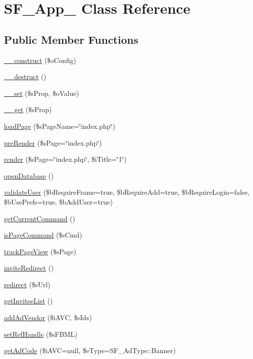 \hypertarget{classSF__App__02}{
\section{SF\_\-App\_ Class Reference}
\label{classSF__App__02}
}
\subsection*{Public Member Functions}
\begin{DoxyCompactItemize}
\item 
\hyperlink{classSF__App__02_a1609c01e73facfc2e0870dab45eddc4d}{\_\-\_\-construct} (\$oConfig)
\item 
\hyperlink{classSF__App__02_a421831a265621325e1fdd19aace0c758}{\_\-\_\-destruct} ()
\item 
\hyperlink{classSF__App__02_a9ad3d2905b2a50dfbee6d5f473e758a9}{\_\-\_\-set} (\$sProp, \$oValue)
\item 
\hyperlink{classSF__App__02_a9519b5bba407a1a89f324fcc7f26c0e2}{\_\-\_\-get} (\$sProp)
\item 
\hyperlink{classSF__App__02_ae1ecd9ab5b45268eb8405fcd83011fb0}{loadPage} (\$sPageName=\char`\"{}index.php\char`\"{})
\item 
\hyperlink{classSF__App__02_a1404a2a435e6df83c906a296e1c5461b}{preRender} (\$sPage=\char`\"{}index.php\char`\"{})
\item 
\hyperlink{classSF__App__02_a79f6c757cc35a847495f9254503dfa8f}{render} (\$sPage=\char`\"{}index.php\char`\"{}, \$iTitle=\char`\"{}1\char`\"{})
\item 
\hyperlink{classSF__App__02_a9dc5da61781d3ffe5bc80275a129d08a}{openDatabase} ()
\item 
\hyperlink{classSF__App__02_a18a992b92ee5ff3ad60ec30d8e0cba60}{validateUser} (\$bRequireFrame=true, \$bRequireAdd=true, \$bRequireLogin=false, \$bUsePrefs=true, \$bAddUser=true)
\item 
\hyperlink{classSF__App__02_a245ca49c58ae5e1c2efcdea0369d5b22}{getCurrentCommand} ()
\item 
\hyperlink{classSF__App__02_aac5925714018c3a661eba69a737d6597}{isPageCommand} (\$sCmd)
\item 
\hyperlink{classSF__App__02_a06cc1f1b035e423dce27f7db925a17c0}{trackPageView} (\$sPage)
\item 
\hyperlink{classSF__App__02_a6deb2041e7ee4cbb3511c0f5a7ea8a03}{inviteRedirect} ()
\item 
\hyperlink{classSF__App__02_a83d6db3f4e5f36ddd8adad2f53133e76}{redirect} (\$sUrl)
\item 
\hyperlink{classSF__App__02_acf7865241ab5ac45a0f04674efe51d1a}{getInviteeList} ()
\item 
\hyperlink{classSF__App__02_af12c69561c23be5e6fc7e4e0a2808fbb}{addAdVendor} (\$iAVC, \$sIds)
\item 
\hyperlink{classSF__App__02_a3978cc0d9152ece4cd315601a95a38bd}{setRefHandle} (\$sFBML)
\item 
\hyperlink{classSF__App__02_a99e97980251298d31efe3451470e8df5}{getAdCode} (\$iAVC=null, \$eType=SF\_\-AdType::Banner)
\end{DoxyCompactItemize}
